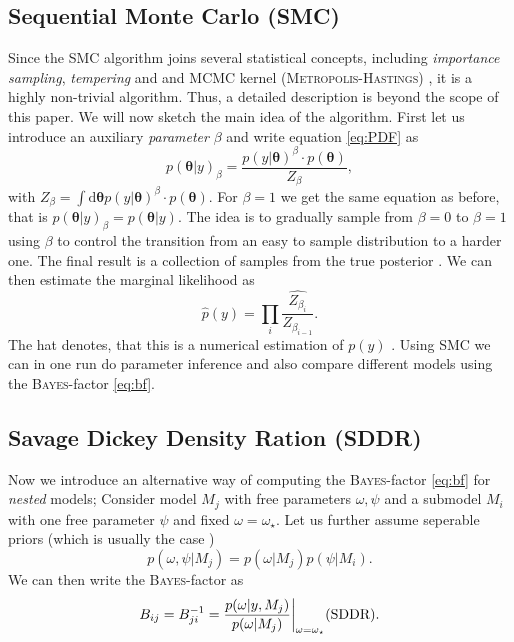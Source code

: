 \documentclass[%
 reprint,
 amsmath,amssymb,
 aps,
]{revtex4-1}
\newcommand{\btheta}{\boldsymbol{\theta}}
\begin{document}
\subsection{Sequential Monte Carlo (SMC)}\label{sec:SMC}
 \noindent
 
 Since the SMC algorithm joins several statistical concepts, including \emph{importance sampling}, \emph{tempering} and and MCMC kernel (\textsc{Metropolis-Hastings}) \cite{PyMC3_SMC}, it is a highly non-trivial algorithm. Thus, a detailed description is beyond the scope of this paper. We will now sketch the main idea of the algorithm. 
 First let us introduce an auxiliary \emph{parameter} $\beta$ and write equation \eqref{eq:PDF} as 
   $$p(\btheta|y)_\beta=\frac{p(y|\btheta)^\beta\cdot p(\btheta)}{Z_\beta},$$
   with $Z_\beta=\int\text{d}\btheta p(y|\btheta)^\beta\cdot p(\btheta)$. For $\beta=1$ we get the same equation as before, that is $p(\btheta|y)_\beta=p(\btheta|y)$. The idea is to gradually sample from $\beta=0$ to $\beta=1$ using $\beta$ to control the transition from an easy to sample distribution to a harder one. The final result is a collection of samples from the true posterior \cite{PyMC3_SMC}. We can then estimate the marginal likelihood as \cite{SMC_PEPE} \begin{equation}\label{eq:with_the_hat}
   	\hat{p}(y)=\prod_{i}\widehat{\frac{Z_{\beta_i}}{Z_{\beta_{i-1}}}}.
   \end{equation}
     The hat denotes, that this is a numerical estimation of $p(y)$ \cite{PyMC3_SMC}. Using SMC we can in one run do parameter inference and also compare different models using the \textsc{Bayes}-factor \eqref{eq:bf}.
 
\subsection{Savage Dickey Density Ration (SDDR)} \label{subsec:sddr}
Now we introduce an alternative way of computing the \textsc{Bayes}-factor \eqref{eq:bf} for \emph{nested} models; Consider model $M_j$ with free parameters $\omega,\psi$ and a submodel $M_i$ with one free parameter $\psi$ and fixed $\omega=\omega_\star$. Let us further assume seperable priors (which is usually the case \cite{trotta}) $$p(\omega,\psi|M_j)=p(\omega|M_j)p(\psi|M_i).$$
We can then write the \textsc{Bayes}-factor as \cite{trotta} \begin{equation}
	\label{eq:sddr}
	B_{ij}=B_{ji}^{-1}=\frac{p(\omega|y,M_j)}{p(\omega|M_j)}\bigg|_{\omega=\omega_\star}  \text{\hfill (SDDR)}.
\end{equation}
\end{document}
